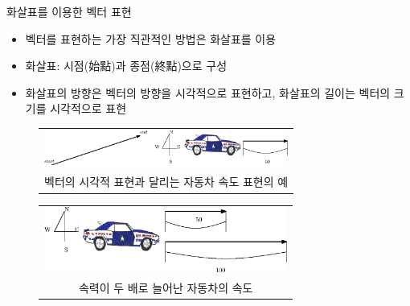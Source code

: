 \begin{frame}{화살표를 이용한 벡터 표현}
\begin{itemize}
\item 벡터를 표현하는 가장 직관적인 방법은 화살표를 이용
\item 화살표: 시점(始點)과 종점(終點)으로 구성 
\item 화살표의 방향은 벡터의 방향을 시각적으로 표현하고, 화살표의 길이는 벡터의 크기를 시각적으로 표현
\end{itemize}

\begin{figure}
\begin{tabular}{c}
\includegraphics[width=8cm]{Math_vector/vectorExpression.eps}\\
{\tiny 벡터의 시각적 표현과 달리는 자동차 속도 표현의 예}
\end{tabular}
\end{figure}

\begin{figure}
\begin{tabular}{c}
\includegraphics[width=8cm]{Math_vector/increasedSpeed.eps}\\
{\tiny 속력이 두 배로 늘어난 자동차의 속도}
\end{tabular}
\end{figure}

\end{frame}

